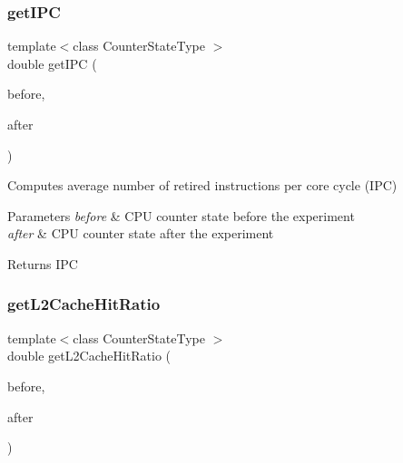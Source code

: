 \subsubsection{\texorpdfstring{get\+I\+PC}{getIPC}}
{\footnotesize\ttfamily template$<$class Counter\+State\+Type $>$ \\
double get\+I\+PC (\begin{DoxyParamCaption}\item[{const Counter\+State\+Type \&}]{before,  }\item[{const Counter\+State\+Type \&}]{after }\end{DoxyParamCaption})\hspace{0.3cm}{\ttfamily [friend]}}



Computes average number of retired instructions per core cycle (I\+PC) 


\begin{DoxyParams}{Parameters}
{\em before} & C\+PU counter state before the experiment \\
\hline
{\em after} & C\+PU counter state after the experiment \\
\hline
\end{DoxyParams}
\begin{DoxyReturn}{Returns}
I\+PC 
\end{DoxyReturn}
\mbox{\label{class_basic_counter_state_a5922acedeec3c1cc67d20670f8ef0518}} 
\subsubsection{\texorpdfstring{get\+L2\+Cache\+Hit\+Ratio}{getL2CacheHitRatio}}
{\footnotesize\ttfamily template$<$class Counter\+State\+Type $>$ \\
double get\+L2\+Cache\+Hit\+Ratio (\begin{DoxyParamCaption}\item[{const Counter\+State\+Type \&}]{before,  }\item[{const Counter\+State\+Type \&}]{after }\end{DoxyParamCaption})\hspace{0.3cm}{\ttfamily [friend]}}




